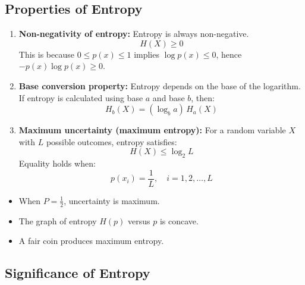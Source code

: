 \documentclass[11pt,a4paper]{book}
\newenvironment{infobox}[1][Information]{
    \begin{tcolorbox}[
        enhanced,
        breakable,
        colback=mintgreen!10,
        colframe=mintgreen!200,
        title=#1,
        fonttitle=\bfseries,
        sharp corners,
        boxrule=0.8pt,
        left=8pt,
        right=8pt,
        top=6pt,
        bottom=6pt
    ]
}{
    \end{tcolorbox}
}
\newenvironment{derivationbox}[1][Derivation]{
    \begin{tcolorbox}[
        enhanced,
        breakable,
        colback=softpeach!10,
        colframe=softpeach!200,
        title=#1,
        fonttitle=\bfseries,
        sharp corners,
        boxrule=0.8pt,
        left=10pt,
        right=10pt,
        top=8pt,
        bottom=8pt
    ]
}{
    \end{tcolorbox}
}
\begin{document}
\subsection{Properties of Entropy}
\begin{infobox}[Properties of Entropy]

\begin{enumerate}
    \item \textbf{Non-negativity of entropy:}
          Entropy is always non-negative.
          \[
              H(X) \ge 0
          \]
          This is because \(0 \le p(x) \le 1\) implies \(\log p(x) \le 0\),
          hence \(-p(x)\log p(x) \ge 0\).

    \item \textbf{Base conversion property:}
          Entropy depends on the base of the logarithm.
          If entropy is calculated using base \(a\) and base \(b\), then:
          \[
              H_b(X) = (\log_b a)\, H_a(X)
          \]

    \item \textbf{Maximum uncertainty (maximum entropy):}
          For a random variable \(X\) with \(L\) possible outcomes,
          entropy satisfies:
          \[
              H(X) \le \log_2 L
          \]
          Equality holds when:
          \[
              p(x_i)=\frac{1}{L}, \quad i=1,2,\ldots,L
          \]
\end{enumerate}
\begin{derivationbox}[Understanding Maximum Entropy]
\begin{itemize}
    \item When \(P=\frac{1}{2}\), uncertainty is maximum.
    \item The graph of entropy \(H(p)\) versus \(p\) is concave.
    \item A fair coin produces maximum entropy.
\end{itemize}
\end{derivationbox}

\end{infobox}

\subsection{Significance of Entropy}
\end{document}
